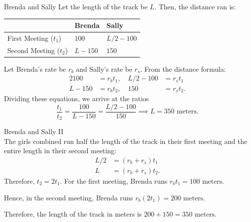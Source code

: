 \documentclass[xcolor=dvipsnames, fontsize=11pt, %
pagesize, %
parskip=half-, t]{beamer}
\begin{document}
\begin{frame}{Brenda and Sally}
	Let the length of the track be $L$. Then, the distance ran is:
	\begin{table}[H] 
		\centering
	\begin{tabular}{l|l|l}
		& Brenda & Sally \\ \hline
		First Meeting ($t_1$) & $100$ & $L/2-100$ \\
		Second Meeting ($t_2$) & $L-150$ & $150$ 
	\end{tabular}
	\end{table}
Let Brenda's rate be $r_b$ and Sally's rate be $r_s$. From the distance formula:
\begin{alignat*}{2} 100&=r_bt_1, \quad L/2-100&=r_st_1 \\
			   L-150&=r_bt_2, \quad 150&=r_st_2. \end{alignat*}
Dividing these equations, we arrive at the ratios $$\frac{t_1}{t_2}=\frac{100}{L-150}=\frac{L/2-100}{150}\implies L=\boxed{350\text{ meters}}.$$
\end{frame}

\begin{frame}{Brenda and Sally II}
	 ~\\
	
The girls combined run half the length of the track in their first meeting and the entire length in their second meeting: 
\begin{align*} L/2&=\left(r_b+r_s\right)t_1 \\
			   L&=\left(r_b+r_s\right)t_2. \end{align*}
Therefore, $t_2=2t_1$. For the first meeting, Brenda runs $r_bt_1=100\text{ meters}.$ \medskip 

Hence, in the second meeting, Brenda runs $r_b\left(2t_1\right)=200\text{ meters}$. \medskip

Therefore, the length of the track in meters is $200+150=\boxed{350\text{ meters}}.$
\end{frame}
\end{document}
